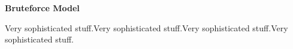 \begin{center} \textbf{\huge Bruteforce Model} \end{center}
Very sophisticated stuff.Very sophisticated stuff.Very sophisticated stuff.Very sophisticated stuff.
